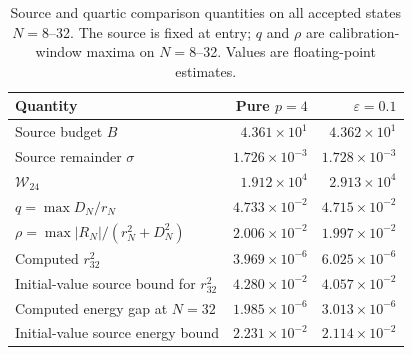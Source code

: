 \begin{table}[!htbp]
\centering
\small
\caption{Source and quartic comparison quantities on all accepted states \(N=8\)--32. The source is fixed at entry; \(q\) and \(\rho\) are calibration-window maxima on \(N=8\)--32. Values are floating-point estimates.}
\label{tab:merged-trajectory-conditions}
\begin{tabularx}{\linewidth}{@{}Xrr@{}}
\toprule
Quantity & Pure \(p=4\) & \(\varepsilon=0.1\) \\
\midrule
Source budget \(B\) & \(4.361\times10^{1}\) & \(4.362\times10^{1}\) \\
Source remainder \(\sigma\) & \(1.726\times10^{-3}\) & \(1.728\times10^{-3}\) \\
\(\mathcal W_{24}\) & \(1.912\times10^{4}\) & \(2.913\times10^{4}\) \\
\(q=\max D_N/r_N\) & \(4.733\times10^{-2}\) & \(4.715\times10^{-2}\) \\
\(\rho=\max |R_N|/(r_N^2+D_N^2)\) & \(2.006\times10^{-2}\) & \(1.997\times10^{-2}\) \\
Computed \(r_{32}^2\) & \(3.969\times10^{-6}\) & \(6.025\times10^{-6}\) \\
Initial-value source bound for \(r_{32}^2\) & \(4.280\times10^{-2}\) & \(4.057\times10^{-2}\) \\
Computed energy gap at \(N=32\) & \(1.985\times10^{-6}\) & \(3.013\times10^{-6}\) \\
Initial-value source energy bound & \(2.231\times10^{-2}\) & \(2.114\times10^{-2}\) \\
\bottomrule
\end{tabularx}
\end{table}

